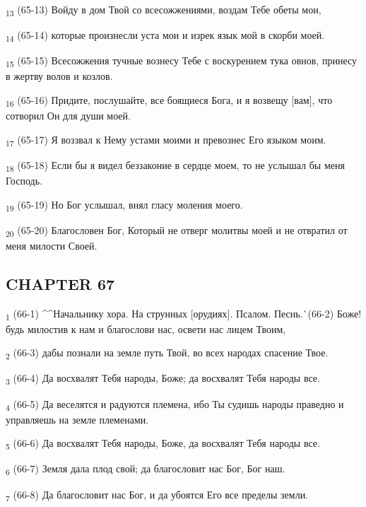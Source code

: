 \begin{tcolorbox}
\textsubscript{13} (65-13) Войду в дом Твой со всесожжениями, воздам Тебе обеты мои,
\end{tcolorbox}
\begin{tcolorbox}
\textsubscript{14} (65-14) которые произнесли уста мои и изрек язык мой в скорби моей.
\end{tcolorbox}
\begin{tcolorbox}
\textsubscript{15} (65-15) Всесожжения тучные вознесу Тебе с воскурением тука овнов, принесу в жертву волов и козлов.
\end{tcolorbox}
\begin{tcolorbox}
\textsubscript{16} (65-16) Придите, послушайте, все боящиеся Бога, и я возвещу [вам], что сотворил Он для души моей.
\end{tcolorbox}
\begin{tcolorbox}
\textsubscript{17} (65-17) Я воззвал к Нему устами моими и превознес Его языком моим.
\end{tcolorbox}
\begin{tcolorbox}
\textsubscript{18} (65-18) Если бы я видел беззаконие в сердце моем, то не услышал бы меня Господь.
\end{tcolorbox}
\begin{tcolorbox}
\textsubscript{19} (65-19) Но Бог услышал, внял гласу моления моего.
\end{tcolorbox}
\begin{tcolorbox}
\textsubscript{20} (65-20) Благословен Бог, Который не отверг молитвы моей и не отвратил от меня милости Своей.
\end{tcolorbox}
\subsection{CHAPTER 67}
\begin{tcolorbox}
\textsubscript{1} (66-1) ^^Начальнику хора. На струнных [орудиях]. Псалом. Песнь.^^ (66-2) Боже! будь милостив к нам и благослови нас, освети нас лицем Твоим,
\end{tcolorbox}
\begin{tcolorbox}
\textsubscript{2} (66-3) дабы познали на земле путь Твой, во всех народах спасение Твое.
\end{tcolorbox}
\begin{tcolorbox}
\textsubscript{3} (66-4) Да восхвалят Тебя народы, Боже; да восхвалят Тебя народы все.
\end{tcolorbox}
\begin{tcolorbox}
\textsubscript{4} (66-5) Да веселятся и радуются племена, ибо Ты судишь народы праведно и управляешь на земле племенами.
\end{tcolorbox}
\begin{tcolorbox}
\textsubscript{5} (66-6) Да восхвалят Тебя народы, Боже, да восхвалят Тебя народы все.
\end{tcolorbox}
\begin{tcolorbox}
\textsubscript{6} (66-7) Земля дала плод свой; да благословит нас Бог, Бог наш.
\end{tcolorbox}
\begin{tcolorbox}
\textsubscript{7} (66-8) Да благословит нас Бог, и да убоятся Его все пределы земли.
\end{tcolorbox}
